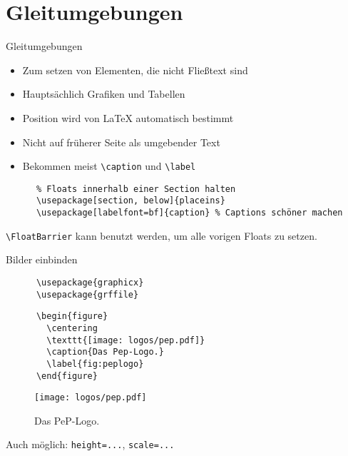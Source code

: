 \section{Gleitumgebungen}
\begin{frame}[fragile]{
  Gleitumgebungen \hfill
}
  \begin{itemize}
    \item Zum setzen von Elementen, die nicht Fließtext sind
    \item Hauptsächlich Grafiken und Tabellen
    \item Position wird von \LaTeX{} automatisch bestimmt
    \item Nicht auf früherer Seite als umgebender Text
    \item Bekommen meist \lstinline+\caption+ und \lstinline+\label+
  \end{itemize}
  \begin{Packages}
    \begin{lstlisting}
      % Floats innerhalb einer Section halten
      \usepackage[section, below]{placeins}
      \usepackage[labelfont=bf]{caption} % Captions schöner machen
    \end{lstlisting}
  \end{Packages}

  \lstinline+\FloatBarrier+ kann benutzt werden, um alle vorigen Floats zu setzen.
\end{frame}

\begin{frame}[fragile]{
  Bilder einbinden \hfill
}
  \begin{Packages}
    \begin{lstlisting}
      \usepackage{graphicx}
      \usepackage{grffile}
    \end{lstlisting}
  \end{Packages}
  \begin{CodeExample}{0.60}
    \begin{lstlisting}
      \begin{figure}
        \centering
        \texttt{[image: logos/pep.pdf]}
        \caption{Das Pep-Logo.}
        \label{fig:peplogo}
      \end{figure}
    \end{lstlisting}
  \CodeResult
    \begin{figure}
      \centering
      \texttt{[image: logos/pep.pdf]}
      \caption{Das PeP-Logo.}
      \label{fig:peplogo}
    \end{figure}
  \end{CodeExample}
  \vspace{5pt}
  Auch möglich: \lstinline+height=...+, \lstinline+scale=...+
\end{frame}

